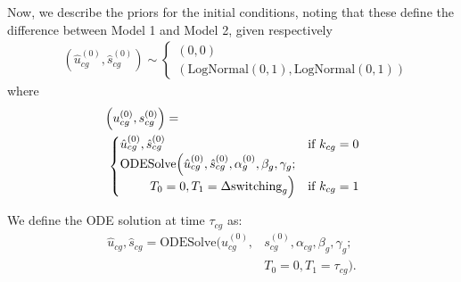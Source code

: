 \documentclass[
  sn-mathphys-num,
  lineno,
  twocolumn]{sn-jnl}
\begin{document}
Now, we describe the priors for the initial conditions, noting that
these define the difference between Model 1 and Model 2, given
respectively \begin{align*}
  &\left(\hat{u}^{(0)}_{cg}, \hat{s}^{(0)}_{cg}\right) \sim 
  \begin{cases}
    (0, 0) \\
    (\text{LogNormal}(0, 1), \text{LogNormal}(0, 1))
  \end{cases}
\end{align*} where \begin{align*}
  &\left(u^{(0)}_{cg}, s^{(0)}_{cg}\right) = \\
  &\hskip 3pt \begin{cases}
    \hat{u}^{(0)}_{cg}, \hat{s}^{(0)}_{cg} & \text{if } k_{cg} = 0 \\
    \textrm{ODESolve}\Big( \hat{u}^{(0)}_{cg}, \hat{s}^{(0)}_{cg}, \alpha^{(0)}_g, \beta_g, \gamma_g; \\
    \hskip 24pt T_0=0, T_1=\Delta \textrm{switching}_g \Big) & \text{if } k_{cg} = 1
  \end{cases}
\end{align*}

We define the ODE solution at time \(\tau_{cg}\) as: \begin{align}
    \hat{u}_{cg}, \hat{s}_{cg} = \text{ODESolve}\Big( u^{(0)}_{cg}, & s^{(0)}_{cg}, \alpha_{cg}, \beta_g, \gamma_g; \nonumber \\
    & T_0=0, T_1=\tau_{cg} \Big). \label{eq-ODE-solve}
\end{align}
\end{document}

